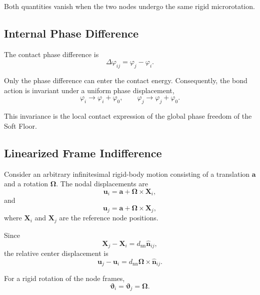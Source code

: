 Both quantities vanish when the two nodes undergo the same rigid microrotation.

\subsection{Internal Phase Difference}

The contact phase difference is
\begin{equation}
    \boxed{ \Delta\varphi_{ij} = \varphi_j - \varphi_i }.
\end{equation}

Only the phase difference can enter the contact energy. Consequently, the bond action is invariant under a uniform phase displacement,
\begin{equation}
    \varphi_i \rightarrow \varphi_i + \varphi_0, \qquad \varphi_j \rightarrow \varphi_j + \varphi_0.
\end{equation}

This invariance is the local contact expression of the global phase freedom of the Soft Floor.

\subsection{Linearized Frame Indifference}

Consider an arbitrary infinitesimal rigid-body motion consisting of a translation $\mathbf{a}$ and a rotation $\boldsymbol{\Omega}$. The nodal displacements are
\begin{equation}
    \mathbf{u}_i = \mathbf{a} + \boldsymbol{\Omega} \times \mathbf{X}_i,
\end{equation}
and
\begin{equation}
    \mathbf{u}_j = \mathbf{a} + \boldsymbol{\Omega} \times \mathbf{X}_j,
\end{equation}
where $\mathbf{X}_i$ and $\mathbf{X}_j$ are the reference node positions.

Since
\begin{equation}
    \mathbf{X}_j - \mathbf{X}_i = d_{\mathrm{nn}} \hat{\mathbf{n}}_{ij},
\end{equation}
the relative center displacement is
\begin{equation}
    \mathbf{u}_j - \mathbf{u}_i = d_{\mathrm{nn}} \boldsymbol{\Omega} \times \hat{\mathbf{n}}_{ij}.
\end{equation}

For a rigid rotation of the node frames,
\begin{equation}
    \boldsymbol{\vartheta}_i = \boldsymbol{\vartheta}_j = \boldsymbol{\Omega}.
\end{equation}

